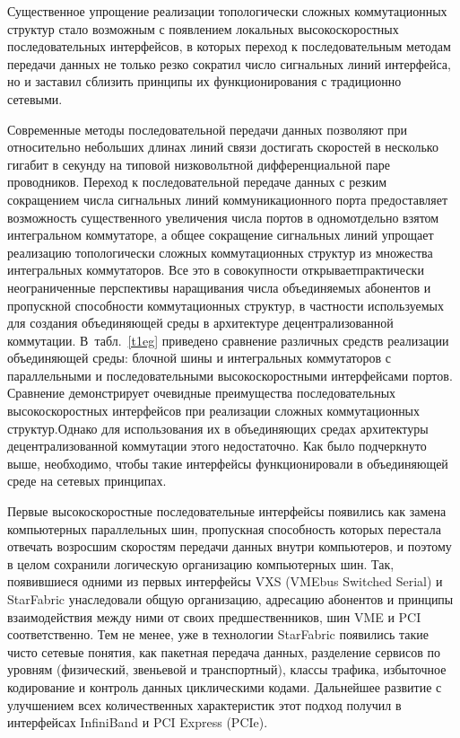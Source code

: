 \begin{multicols}{2}
\vspace*{-3pt}
     
     Существенное упрощение реализации топологически сложных коммутационных 
структур стало возможным с появлением локальных высокоскоростных последовательных 
интерфейсов, в которых переход к последовательным методам передачи данных не только 
резко сократил число сигнальных линий интерфейса, но и заставил сблизить принципы их 
функционирования с традиционно сетевыми.
     
     Современные методы последовательной передачи данных позволяют при относительно 
небольших длинах линий связи достигать скоростей в\linebreak
несколько гигабит в секунду на 
типовой низковольтной дифференциальной паре проводников. Переход к последовательной 
передаче данных с резким сокращением числа сигнальных линий коммуникационного порта 
предоставляет возможность существенного увеличения числа портов в одном\linebreak отдельно 
взятом интегральном коммутаторе, а общее сокращение сигнальных линий упрощает\linebreak 
реализацию топологически сложных коммутационных структур из множества интегральных 
коммутаторов. Все это в совокупности открывает\linebreak практически неограниченные перспективы 
наращивания числа объединяемых абонентов и пропускной способности коммутационных 
структур, в частности используемых для создания объеди\-ня\-ющей среды в архитектуре 
децентрализованной коммутации. В~табл.~\ref{t1eg} приведено сравнение различных 
средств реализации объеди\-ня\-ющей среды: блочной шины и интегральных коммутаторов с\linebreak 
параллельными и последовательными высокоскоростными интерфейсами портов. Сравнение 
демонстрирует очевидные преимущества последовательных высокоскоростных интерфейсов 
при реализации сложных коммутационных структур.\linebreak Однако для использования их в 
объединяющих средах архитектуры децентрализованной коммутации этого недостаточно. 
Как было подчеркнуто выше, необходимо, чтобы такие интерфейсы функционировали в 
объеди\-ня\-ющей среде на сетевых прин\-ципах.


     Первые высокоскоростные последовательные интерфейсы появились как замена 
компьютерных параллельных шин, пропускная способность которых перестала отвечать 
возросшим скоростям передачи данных внутри компьютеров, и поэтому в\linebreak
целом сохранили 
логическую организацию компьютерных шин. Так, появившиеся одними из первых 
интерфейсы VXS (VMEbus Switched Serial) и StarFabric унаследовали общую организацию, 
адресацию абонентов и принципы взаимодействия между ними от своих предшественников, 
шин VME и PCI соответственно. Тем не менее, уже в технологии StarFabric появились такие 
чисто сетевые понятия, как пакетная передача данных, разделение сервисов по уровням 
(физический, звеньевой и транспортный), классы трафика, избыточное кодирование 
и контроль данных циклическими кодами. Дальнейшее развитие с улучшением всех 
количественных характеристик этот подход получил в интерфейсах InfiniBand и PCI Express 
(PCIe). 


\end{multicols}

